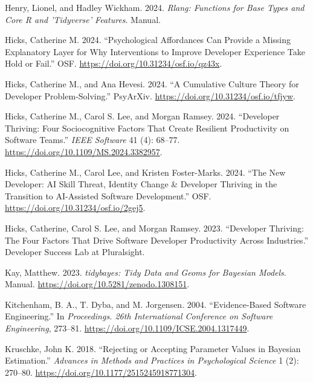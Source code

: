\documentclass[
]{article}
\newlength{\cslhangindent}
\newenvironment{CSLReferences}[2] %
 {\begin{list}{}{%
  \setlength{\itemindent}{0pt}
  \setlength{\leftmargin}{0pt}
  \setlength{\parsep}{0pt}
  \ifodd #1
   \setlength{\leftmargin}{\cslhangindent}
   \setlength{\itemindent}{-1\cslhangindent}
  \fi
  \setlength{\itemsep}{#2\baselineskip}}}
 {\end{list}}
\begin{document}
\begin{CSLReferences}{1}{0}
Henry, Lionel, and Hadley Wickham. 2024. \emph{Rlang: {Functions} for
Base Types and Core {R} and 'Tidyverse' Features}. Manual.

Hicks, Catherine M. 2024. {``Psychological {Affordances Can Provide} a
{Missing Explanatory Layer} for {Why Interventions} to {Improve
Developer Experience Take Hold} or {Fail}.''} OSF.
\url{https://doi.org/10.31234/osf.io/qz43x}.

Hicks, Catherine M., and Ana Hevesi. 2024. {``A {Cumulative Culture
Theory} for {Developer Problem-Solving}.''} PsyArXiv.
\url{https://doi.org/10.31234/osf.io/tfjyw}.

Hicks, Catherine M., Carol S. Lee, and Morgan Ramsey. 2024. {``Developer
{Thriving}: {Four Sociocognitive Factors That Create Resilient
Productivity} on {Software Teams}.''} \emph{IEEE Software} 41 (4):
68--77. \url{https://doi.org/10.1109/MS.2024.3382957}.

Hicks, Catherine M., Carol Lee, and Kristen Foster-Marks. 2024. {``The
{New Developer}: {AI Skill Threat}, {Identity Change} \& {Developer
Thriving} in the {Transition} to {AI-Assisted Software Development}.''}
OSF. \url{https://doi.org/10.31234/osf.io/2gej5}.

Hicks, Catherine, Carol S. Lee, and Morgan Ramsey. 2023. {``Developer
{Thriving}: {The} Four Factors That Drive {Software Developer
Productivity} Across {Industries}.''} Developer Success Lab at
Pluralsight.

Kay, Matthew. 2023. \emph{{tidybayes}: {Tidy} Data and Geoms for
{Bayesian} Models}. Manual.
\url{https://doi.org/10.5281/zenodo.1308151}.

Kitchenham, B. A., T. Dyba, and M. Jorgensen. 2004. {``Evidence-Based
Software Engineering.''} In \emph{Proceedings. 26th {International
Conference} on {Software Engineering}}, 273--81.
\url{https://doi.org/10.1109/ICSE.2004.1317449}.

Kruschke, John K. 2018. {``Rejecting or {Accepting Parameter Values} in
{Bayesian Estimation}.''} \emph{Advances in Methods and Practices in
Psychological Science} 1 (2): 270--80.
\url{https://doi.org/10.1177/2515245918771304}.


\end{CSLReferences}
\end{document}
